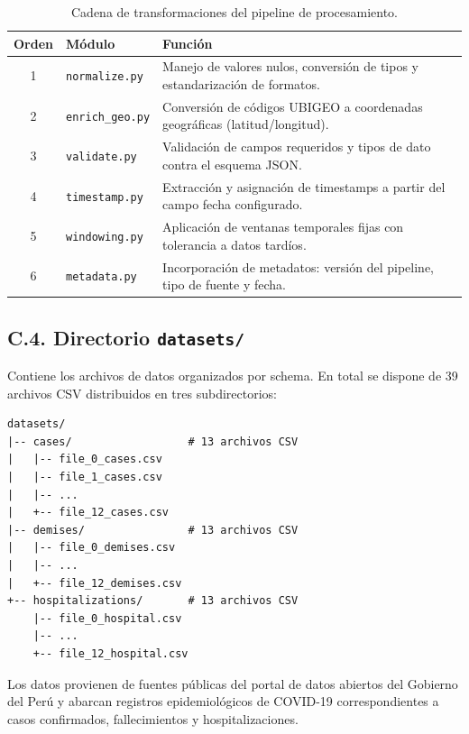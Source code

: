 \documentclass[12pt,a4paper]{article}
\begin{document}
\begin{table}[h!]
    \centering
    \renewcommand{\arraystretch}{1.2}
    \begin{tabular}{|c|l|p{9cm}|}
        \hline
        \textbf{Orden} & \textbf{Módulo}         & \textbf{Función} \\ \hline
        1 & \texttt{normalize.py}   & Manejo de valores nulos, conversión de tipos y estandarización de formatos. \\ \hline
        2 & \texttt{enrich\_geo.py} & Conversión de códigos UBIGEO a coordenadas geográficas (latitud/longitud).  \\ \hline
        3 & \texttt{validate.py}    & Validación de campos requeridos y tipos de dato contra el esquema JSON.     \\ \hline
        4 & \texttt{timestamp.py}   & Extracción y asignación de timestamps a partir del campo fecha configurado. \\ \hline
        5 & \texttt{windowing.py}   & Aplicación de ventanas temporales fijas con tolerancia a datos tardíos.     \\ \hline
        6 & \texttt{metadata.py}    & Incorporación de metadatos: versión del pipeline, tipo de fuente y fecha.   \\ \hline
    \end{tabular}
    \caption{Cadena de transformaciones del pipeline de procesamiento.}
    \label{tab:transformaciones_pipeline}
\end{table}


\subsection*{C.4. Directorio \texttt{datasets/}}

Contiene los archivos de datos organizados por schema. En total se dispone de 39 archivos CSV distribuidos en tres subdirectorios:

\begin{verbatim}
datasets/
|-- cases/                  # 13 archivos CSV
|   |-- file_0_cases.csv
|   |-- file_1_cases.csv
|   |-- ...
|   +-- file_12_cases.csv
|-- demises/                # 13 archivos CSV
|   |-- file_0_demises.csv
|   |-- ...
|   +-- file_12_demises.csv
+-- hospitalizations/       # 13 archivos CSV
    |-- file_0_hospital.csv
    |-- ...
    +-- file_12_hospital.csv
\end{verbatim}

Los datos provienen de fuentes públicas del portal de datos abiertos del Gobierno del Perú y abarcan registros epidemiológicos de COVID-19 correspondientes a casos confirmados, fallecimientos y hospitalizaciones.
\end{document}
